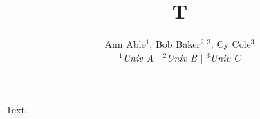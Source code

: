 \documentclass[conference]{IEEEtran}
\begin{document}
\title{T}
\author{Ann Able$^{1}$, Bob Baker$^{2,3}$, Cy Cole$^{3}$
\\
\textit{$^1$Univ A} $|$ \textit{$^2$Univ B} $|$ \textit{$^3$Univ C}}
\maketitle
Text.
\end{document}

